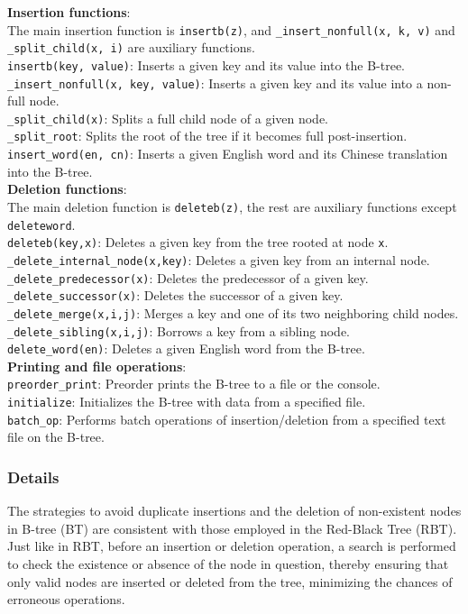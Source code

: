 \documentclass[UTF8]{ctexart}
\begin{document}
\textbf{Insertion functions}:\\
The main insertion function is \texttt{insertb(z)}, and \texttt{\_insert\_nonfull(x, k, v)} and \texttt{\_split\_child(x, i)} are auxiliary functions.\\
\texttt{insertb(key, value)}: Inserts a given key and its value into the B-tree.\\
\texttt{\_insert\_nonfull(x, key, value)}: Inserts a given key and its value into a non-full node.\\
\texttt{\_split\_child(x)}: Splits a full child node of a given node.\\
\texttt{\_split\_root}: Splits the root of the tree if it becomes full post-insertion.\\
\texttt{insert\_word(en, cn)}: Inserts a given English word and its Chinese translation into the B-tree.\\

\textbf{Deletion functions}:\\
The main deletion function is \texttt{deleteb(z)}, the rest are auxiliary functions except \texttt{deleteword}.\\
\texttt{deleteb(key,x)}: Deletes a given key from the tree rooted at node \texttt{x}.\\
\texttt{\_delete\_internal\_node(x,key)}: Deletes a given key from an internal node.\\
\texttt{\_delete\_predecessor(x)}: Deletes the predecessor of a given key.\\
\texttt{\_delete\_successor(x)}: Deletes the successor of a given key.\\
\texttt{\_delete\_merge(x,i,j)}: Merges a key and one of its two neighboring child nodes.\\
\texttt{\_delete\_sibling(x,i,j)}: Borrows a key from a sibling node.\\
\texttt{delete\_word(en)}: Deletes a given English word from the B-tree.\\

\textbf{Printing and file operations}:\\
\texttt{preorder\_print}: Preorder prints the B-tree to a file or the console.\\
\texttt{initialize}: Initializes the B-tree with data from a specified file.\\
\texttt{batch\_op}: Performs batch operations of insertion/deletion from a specified text file on the B-tree.\\

\subsubsection*{Details}
The strategies to avoid duplicate insertions and the deletion of non-existent nodes in B-tree (BT) are consistent with those employed in the Red-Black Tree (RBT). Just like in RBT, before an insertion or deletion operation, a search is performed to check the existence or absence of the node in question, thereby ensuring that only valid nodes are inserted or deleted from the tree, minimizing the chances of erroneous operations.
\end{document}
